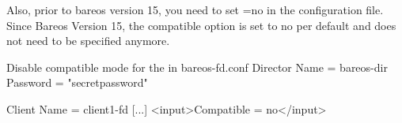 Also, prior to bareos version 15, you need to set =no in the  configuration file.
Since Bareos Version 15, the compatible option is set to no per default and does not need to be specified anymore.
\begin{bconfig}{Disable compatible mode for the \bareosFd in bareos-fd.conf} 
Director {
  Name = bareos-dir
  Password = "secretpassword"
}

Client {
   Name = client1-fd
   [...]
   <input>Compatible = no</input>
}
\end{bconfig}
